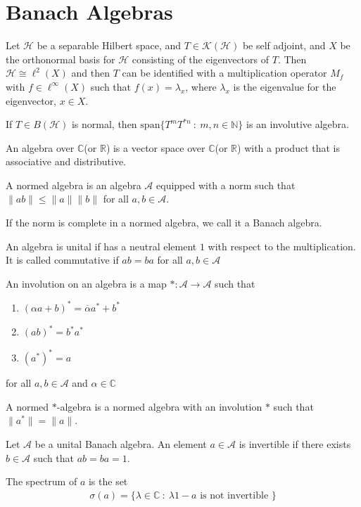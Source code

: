 
\chapter{Banach Algebras}

Let $\mathcal{H}$ be a separable Hilbert space, and  $T \in
\mathcal{K}(\mathcal{H})$ be self adjoint, and $X$ be the
orthonormal basis for $\mathcal{H}$ consisting of the eigenvectors of
$T$. Then $\mathcal{H} \cong \ell^{2}(X)$ and then $T$ can be
identified with a multiplication operator $M_f$ with $f \in
\ell^{\infty}(X)$ such that $f(x) = \lambda_x$, where $\lambda_x$ is
the eigenvalue for the eigenvector, $x \in X$.

If $T \in B(\mathcal{H})$ is normal, then $\textrm{span}\{ T^mT^{*n}
\ : \   m, n \in \mathbb{N} \}$ is an involutive algebra.

\begin{definition}
  An algebra over $\mathbb{C}$(or $\mathbb{R}$) is a vector space
  over $\mathbb{C}$(or $\mathbb{R}$) with a product that is
  associative and distributive.

  A normed algebra is an algebra $\mathcal{A}$ equipped with a norm
  such that $\|ab\| \le \|a\|\|b\|$ for all $a, b \in \mathcal{A}$.

  If the norm is complete in a normed algebra, we call it a Banach algebra.

  An algebra is unital if has a neutral element $1$ with respect to
  the multiplication. It is called commutative if $ab = ba$ for all
  $a, b \in \mathcal{A}$

  An involution on an algebra is a map $*: \mathcal{A} \to
  \mathcal{A}$ such that
  \begin{enumerate}[label=(\arabic*)]
    \item $(\alpha a + b)^* = \overline{\alpha} a^* + b^*$
    \item $(ab)^* = b^*a^*$
    \item $(a^*)^* = a$
  \end{enumerate}
  for all $a, b \in \mathcal{A}$ and $\alpha \in \mathbb{C}$

  A normed $*$-algebra is a normed algebra with an involution $*$
  such that $\|a^*\| = \|a\|$.
\end{definition}

\begin{definition}
  Let $\mathcal{A}$ be a  unital Banach algebra. An element $a \in
  \mathcal{A}$ is invertible if there exists $b \in \mathcal{A}$ such
  that $ab = ba = 1$.

  The spectrum of $a$ is the set
  \begin{align*}
    \sigma(a) = \{ \lambda \in \mathbb{C}  \ : \  \lambda 1 - a
    \textrm{ is not invertible } \}
  \end{align*}
\end{definition}

